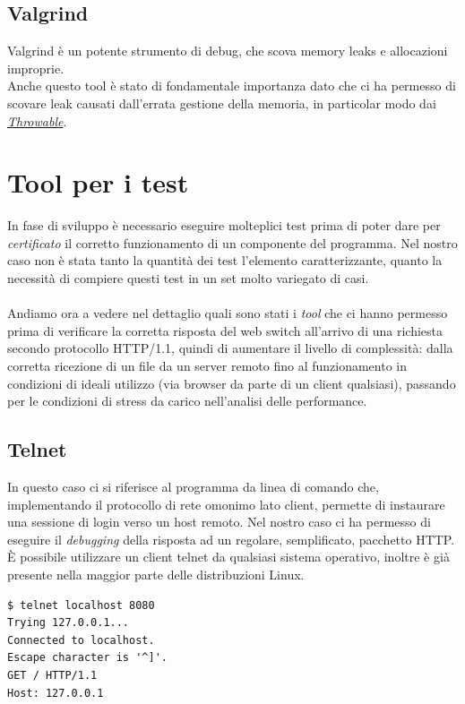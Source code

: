\documentclass[italian]{tktltiki2}
\begin{document}
\subsection{Valgrind}
Valgrind\cite{valgrind} è un potente strumento di debug, che scova memory leaks e allocazioni improprie.
\\
Anche questo tool è stato di fondamentale importanza dato che ci ha permesso di scovare leak causati dall'errata gestione della memoria, in particolar modo dai \hyperref[sec:errors]{\emph{Throwable}}.

\newpage
\section{Tool per i test}
In fase di sviluppo è necessario eseguire molteplici test prima di poter dare per \emph{certificato} il corretto funzionamento di un componente del programma. Nel nostro caso non è stata tanto la quantità dei test l'elemento caratterizzante, quanto la necessità di compiere questi test in un set molto variegato di casi. 
\\
\\
Andiamo ora a vedere nel dettaglio quali sono stati i \emph{tool} che ci hanno permesso prima di verificare la corretta risposta del web switch all'arrivo di una richiesta secondo protocollo HTTP/1.1, quindi di aumentare il livello di complessità: dalla corretta ricezione di un file da un server remoto fino al funzionamento in condizioni di ideali utilizzo (via browser da parte di un client qualsiasi), passando per le condizioni di stress da carico nell'analisi delle performance.
\subsection{Telnet}
In questo caso ci si riferisce al programma da linea di comando che, implementando il protocollo di rete omonimo lato client, permette di instaurare una sessione di login verso un host remoto. Nel nostro caso ci ha permesso di eseguire il \emph{debugging} della risposta ad un regolare, semplificato, pacchetto HTTP. È possibile utilizzare un client telnet da qualsiasi sistema operativo, inoltre è già presente nella maggior parte delle distribuzioni Linux.
\begin{lstlisting}
$ telnet localhost 8080
Trying 127.0.0.1...
Connected to localhost.
Escape character is '^]'.
GET / HTTP/1.1
Host: 127.0.0.1
\end{lstlisting}
\end{document}
